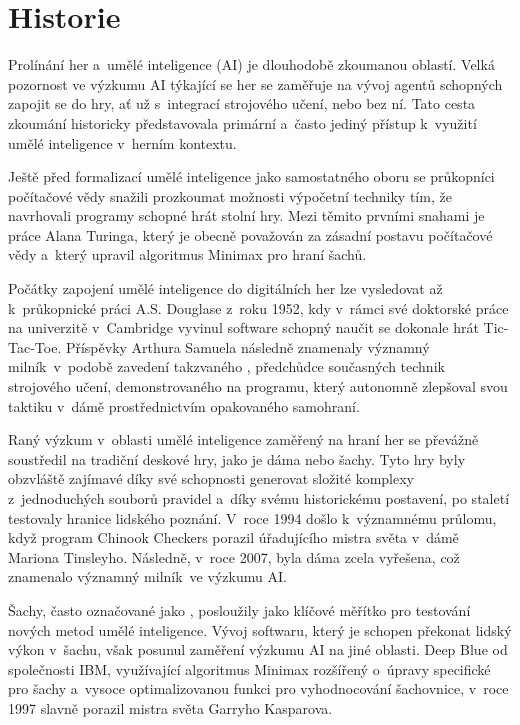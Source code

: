 \section{Historie}
Prolínání her a~umělé inteligence (AI) je dlouhodobě zkoumanou oblastí. Velká pozornost ve výzkumu AI týkající se her se zaměřuje na vývoj agentů schopných zapojit se do hry, ať už s~integrací strojového učení, nebo bez ní. Tato cesta zkoumání historicky představovala primární a~často jediný přístup k~využití umělé inteligence v~herním kontextu.

Ještě před formalizací umělé inteligence jako samostatného oboru se průkopníci počítačové vědy snažili prozkoumat možnosti výpočetní techniky tím, že navrhovali programy schopné hrát stolní hry. Mezi těmito prvními snahami je práce Alana Turinga, který je obecně považován za zásadní postavu počítačové vědy a~který upravil algoritmus Minimax pro hraní šachů.

Počátky zapojení umělé inteligence do digitálních her lze vysledovat až k~průkopnické práci A.S. Douglase z~roku 1952, kdy v~rámci své doktorské práce na univerzitě v~Cambridge vyvinul software schopný naučit se dokonale hrát Tic-Tac-Toe. Příspěvky Arthura Samuela následně znamenaly významný milník~v~podobě zavedení takzvaného , předchůdce současných technik strojového učení, demonstrovaného na programu, který autonomně zlepšoval svou taktiku v~dámě prostřednictvím opakovaného samohraní\cite{Samuel1959}.

Raný výzkum v~oblasti umělé inteligence zaměřený na hraní her se převážně soustředil na tradiční deskové hry, jako je dáma nebo šachy. Tyto hry byly obzvláště zajímavé díky své schopnosti generovat složité komplexy z~jednoduchých souborů pravidel a~díky svému historickému postavení, po staletí testovaly hranice lidského poznání. V~roce 1994 došlo k~významnému průlomu, když program Chinook Checkers porazil úřadujícího mistra světa v~dámě Mariona Tinsleyho. Následně, v~roce 2007, byla dáma zcela vyřešena\cite{SBBKMLLS2007}, což znamenalo významný milník~ve výzkumu AI.

\newpage

Šachy, často označované jako , posloužily jako klíčové měřítko pro testování nových metod umělé inteligence. Vývoj softwaru, který je schopen překonat lidský výkon v~šachu, však posunul zaměření výzkumu AI na jiné oblasti. Deep Blue\cite{WikiDB} od společnosti IBM, využívající algoritmus Minimax rozšířený o~úpravy specifické pro šachy a~vysoce optimalizovanou funkci pro vyhodnocování šachovnice, v~roce 1997 slavně porazil mistra světa Garryho Kasparova.

